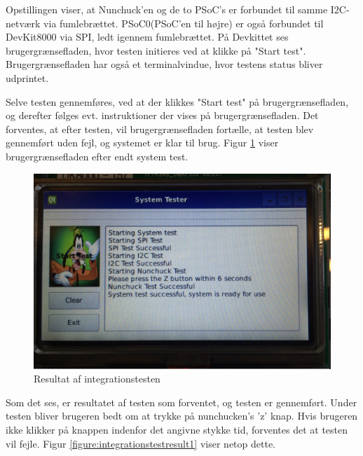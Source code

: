 Opstillingen viser, at Nunchuck'en og de to PSoC's er forbundet til samme I2C-netværk via fumlebrættet. PSoC0(PSoC'en til højre) er også forbundet til DevKit8000 via SPI, ledt igennem fumlebrættet. På Devkittet ses brugergrænsefladen, hvor testen initieres ved at klikke på "Start test". Brugergrænsefladen har også et terminalvindue, hvor testens status bliver udprintet.

Selve testen gennemføres, ved at der klikkes "Start test" på brugergrænsefladen, og derefter følges evt. instruktioner der vises på brugergrænsefladen. Det forventes, at efter testen, vil brugergrænsefladen fortælle, at testen blev gennemført uden fejl, og systemet er klar til brug. Figur \ref{figure:integrationstestresult} viser brugergrænsefladen efter endt system test.

\begin{figure}[H]
	\centering
	\includegraphics[width=\textwidth]{Test/images/IntegrationstestProtokoller/resultat2}
	\caption{Resultat af integrationstesten}
	\label{figure:integrationstestresult}
\end{figure}

Som det ses, er resultatet af testen som forventet, og testen er gennemført. Under testen bliver brugeren bedt om at trykke på nunchucken's 'z' knap. Hvis brugeren ikke klikker på knappen indenfor det angivne stykke tid, forventes det at testen vil fejle. Figur \ref{figure:integrationstestresult1} viser netop dette.


